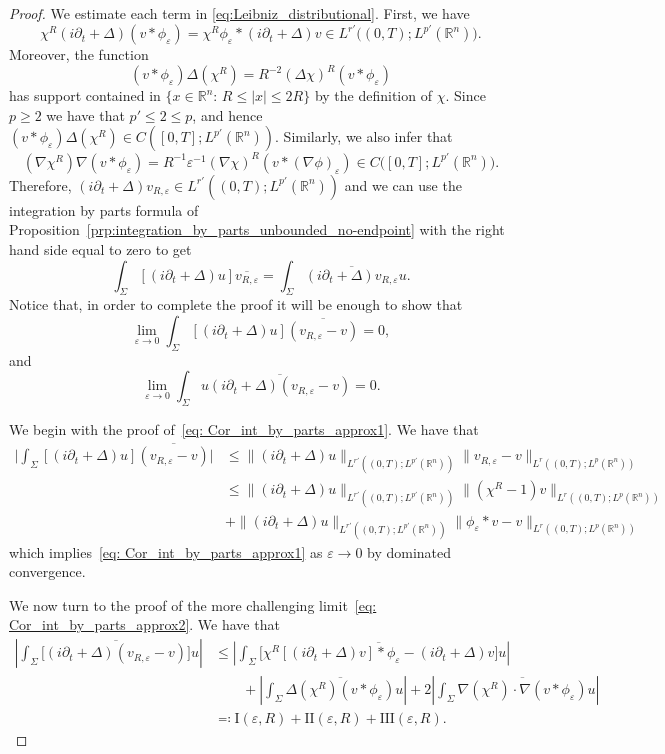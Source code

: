 \documentclass[11pt,a4paper]{amsart}
\theoremstyle{remark}
\theoremstyle{definition}
\newcommand{\R}{\mathbb{R}}
\def\ve{\varepsilon}
\def\ovl{\overline}
\def\d{\partial}
\begin{document}
\begin{proof}
We estimate each term in \eqref{eq:Leibniz_distributional}. First, we have
\[
\chi^R (i\d_t + \Delta)(v*\phi_\ve) = \chi^R \phi_\ve * (i\d_t + \Delta)v \in L^{r'}\big((0, T); L^{p'}(\R^n)\big).
\]
Moreover, the function
\[
( v*\phi_\ve ) \Delta(\chi^R) = R^{-2} (\Delta \chi)^R (v*\phi_\ve)
\]
has support contained in $\{x\in\R^n:\, R\leq |x|\leq 2R\}$ by the definition of $\chi$. Since $p\geq 2$ we have that $p'\leq 2 \leq p$, and hence $(v*\phi_\ve) \Delta (\chi^R)\in C([0, T]; L^{p'}(\R^n))$.  Similarly, we also infer that 
\[
( \nabla \chi^R ) \nabla (v*\phi_\ve) = R^{-1} \ve^{-1} (\nabla \chi)^R (v* (\nabla \phi)_\ve) \in C\big ([0, T]; L^{p'}(\R^n)\big). 
\]
Therefore, $(i \d_t + \Delta )v_{R, \ve} \in L^{r'}((0, T); L^{p'}(\R^n))$ and we can use the integration by parts formula of Proposition~\ref{prp:integration_by_parts_unbounded_no-endpoint} with the right hand side equal to zero to get 
\[
\int_\Sigma [(i\d_t + \Delta)u] \ovl{v_{R,\ve}} = \int_\Sigma \ovl{(i\d_t + \Delta) v_{R, \ve}}  u.
\]
Notice that, in order to complete the proof it will be enough to show that 
\begin{equation}\label{eq: Cor_int_by_parts_approx1}
\lim_{\ve \to 0} \int_\Sigma \left[(i\d_t + \Delta) u\right] \ovl{(v_{R, \ve} - v)} = 0, 
\end{equation}
and
\begin{equation}\label{eq: Cor_int_by_parts_approx2}
\lim_{\ve \to 0} \int_\Sigma u  \ovl{\left(i\d_t + \Delta\right)(v_{R, \ve} - v)} = 0.
\end{equation}

We begin with the proof of~\eqref{eq: Cor_int_by_parts_approx1}. We have that 
\begin{align*}
\Big| \int_\Sigma  [(i\d_t + \Delta) u] \ovl{(v_{R, \ve} - v)} \Big| &\leq 
\| (i\d_t + \Delta)u \|_{L^{r'}((0, T); L^{p'}(\R^n))} \| v_{R, \ve} - v \|_{L^r((0, T); L^p(\R^n))} \\
&\leq \| (i\d_t + \Delta)u \|_{L^{r'}((0, T); L^{p'}(\R^n))} \| (\chi^R - 1) v\|_{L^r((0, T); L^p(\R^n))} \\
&+ \| (i\d_t + \Delta)u \|_{L^{r'}((0, T); L^{p'}(\R^n))} \| \phi_\ve * v - v \|_{L^r((0, T); L^p(\R^n))}
\end{align*}
which implies~\eqref{eq: Cor_int_by_parts_approx1} as $\ve \to 0$ by dominated convergence. 

We now turn to the proof of the more challenging limit~\eqref{eq: Cor_int_by_parts_approx2}. We have that 
\begin{equation}\label{eq: Cor_int_by_parts_approx2_split} 
\begin{split}
\left| \int_\Sigma \big[ \ovl{ (i\d_t + \Delta)(v_{R,\ve} -v) } \big] u \right| &\leq
\left| \int_\Sigma \big[ \ovl{ \chi^R [(i\d_t+\Delta)v]*\phi_\ve - (i\d_t+\Delta)v }\big] u \right| 
\\
&\qquad +\left| \int_\Sigma \overline{\Delta(\chi^R) (v*\phi_\ve)} u \right| 
+ 2 \left| \int_\Sigma \overline{\nabla (\chi^R) \cdot \nabla (v*\phi_\ve)} u \right|
\\
&\eqqcolon \mathrm{I}(\ve,R)+\mathrm{II}(\ve,R)+\mathrm{III}(\ve,R).
\end{split}  
\end{equation}


\end{proof}
\end{document}
